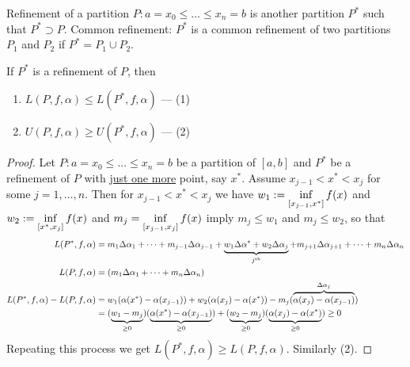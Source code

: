 \documentclass[]{article}
\begin{document}
Refinement of a partition $P:a=x_0\leq \dots\leq x_n=b$ is another partition $P^*$ such that $P^*\supset P$.
Common refinement: $P^*$ is a common refinement of two partitions $P_1$ and $P_2$ if $P^* = P_1\cup P_2$.
\begin{theorem}
	If $P^*$ is a refinement of $P$, then 
	\begin{enumerate}
		\item[] $L(P,f,\alpha) \leq L(P^*,f,\alpha)$ --- (1)
		\item[] $U(P,f,\alpha) \geq U(P^*,f,\alpha)$ --- (2)
	\end{enumerate}
\end{theorem}
\begin{proof}
	Let $P: a=x_0\leq \dots\leq x_n=b$ be a partition of $[a,b]$ and $P^*$ be a refinement of $P$ with \ul{just one more} point, say $x^*$.
	Assume $x_{j-1}<x^*<x_j$ for some $j=1,\dots,n$.
	Then for $x_{j-1}<x^*<x_j$ we have $\ds w_1:=\inf_{[x_{j-1},x^*]} f(x)$ and $\ds w_2:= \inf_{[x^*,x_j]} f(x)$ and $\ds m_j = \inf_{[x_{j-1},x_j]} f(x)$ imply $m_j\leq w_1$ and $m_j\leq w_2$, so that
	\begin{align*}
		L(P^*,f,\alpha) &= m_1\Delta\alpha_1 + \dots + m_{j-1}\Delta\alpha_{j-1} + \ub{j^\text{th}}{w_1\Delta\alpha^* + w_2\Delta\alpha_j} + m_{j+1}\Delta\alpha_{j+1} + \dots + m_n\Delta\alpha_n \\
		L(P,f,\alpha) &= (m_1\Delta\alpha_1 + \dots + m_n\Delta\alpha_n) \\
		L(P^*,f,\alpha)-L(P,f,\alpha) 
		&= w_1(\alpha(x^*)-\alpha(x_{j-1})) + w_2(\alpha(x_j)-\alpha(x^*)) - m_j(\ob{\Delta\alpha_j}{\alpha(x_j)-\alpha(x_{j-1})}) \\
					  &= (\ub{\geq0}{w_1-m_j})(\ub{\geq0}{\alpha(x^*)-\alpha(x_{j-1})}) + (\ub{\geq0}{w_2-m_j})(\ub{\geq0}{\alpha(x_j)-\alpha(x^*)}) \geq 0
	\end{align*}
	Repeating this process we get $L(P^*,f,\alpha)\geq L(P,f,\alpha)$. Similarly (2).
\end{proof}
\end{document}
